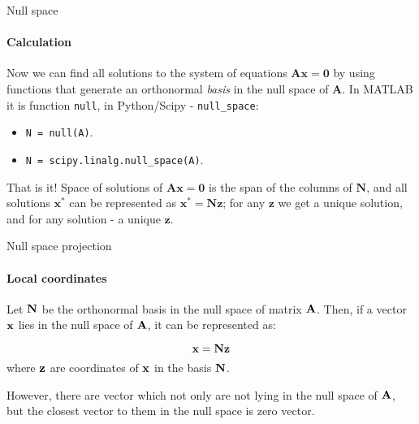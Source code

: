 \documentclass{beamer}
\begin{document}
\begin{frame}{Null space}
\framesubtitle{Calculation}
\begin{flushleft}

Now we can find all solutions to the system of equations $\mathbf{A} \mathbf{x} = \mathbf{0}$ by using functions that generate an orthonormal \emph{basis} in the null space of $\mathbf{A}$. In MATLAB it is function \texttt{null}, in Python/Scipy - \texttt{null\_space}:

\bigskip

\begin{itemize}
    \item \texttt{N = null(A)}.
    \item \texttt{N = scipy.linalg.null\_space(A)}.
\end{itemize}

\bigskip

That is it! Space of solutions of $\mathbf{A} \mathbf{x} = \mathbf{0}$ is the span of the columns of $\mathbf{N}$, and all solutions $\mathbf{x}^*$ can be represented as $\mathbf{x}^* = \mathbf{N}\mathbf{z}$; for any $\mathbf{z}$ we get a unique solution, and for any solution - a unique $\mathbf{z}$.

\end{flushleft}
\end{frame}



\begin{frame}{Null space projection}
\framesubtitle{Local coordinates}
\begin{flushleft}

Let $\mathbf{N}$ be the orthonormal basis in the null space of matrix $\mathbf{A}$. Then, if a vector $\mathbf{x}$ lies in the null space of $\mathbf{A}$, it can be represented as:

\begin{equation}
    \mathbf{x} = \mathbf{N}\mathbf{z}
\end{equation}
%
where $\mathbf{z}$ are coordinates of $\mathbf{x}$ in the basis $\mathbf{N}$.

\bigskip

However, there are vector which not only are not lying in the null space of $\mathbf{A}$,  but the closest vector to them in the null space is zero vector.

\end{flushleft}
\end{frame}
\end{document}
